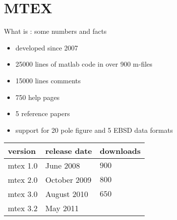 
\frame[plain]{\titlepage}


\section{MTEX}


\begin{frame}{What is \MTEX: some numbers and facts}


\begin{block}{}

\begin{itemize}
\item developed since 2007
\item 25000 lines of matlab code in over 900 m-files
\item 15000 lines comments
\item 750 help pages
\item 5 reference papers
\item support for 20 pole figure and 5 EBSD data formats
\end{itemize}
\end{block}

\begin{block}{}
  \vspace*{0.25em}
  \hspace{1.25em}
  \begin{tabular}{lll}
    version & release date & downloads \\
    \toprule
    mtex 1.0 & June 2008 & $900$ \\
    mtex 2.0 & October 2009 & $800$ \\
    mtex 3.0 & August 2010 & $650$\\
    mtex 3.2 & May 2011 &
  \end{tabular}
\end{block}


\end{frame}



